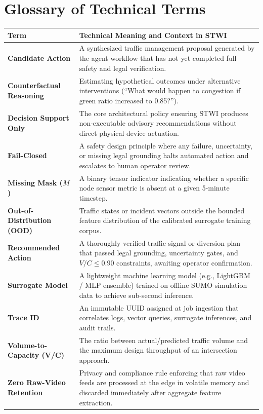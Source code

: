 \chapter*{Glossary of Technical Terms}

\begin{longtable}{|p{4.2cm}|p{10.8cm}|}
\hline
\rowcolor{blue!10}
\textbf{Term} & \textbf{Technical Meaning and Context in STWI} \\
\hline
\endhead

\textbf{Candidate Action} & A synthesized traffic management proposal generated by the agent workflow that has not yet completed full safety and legal verification. \\
\hline
\textbf{Counterfactual Reasoning} & Estimating hypothetical outcomes under alternative interventions (``What would happen to congestion if green ratio increased to 0.85?''). \\
\hline
\textbf{Decision Support Only} & The core architectural policy ensuring STWI produces non-executable advisory recommendations without direct physical device actuation. \\
\hline
\textbf{Fail-Closed} & A safety design principle where any failure, uncertainty, or missing legal grounding halts automated action and escalates to human operator review. \\
\hline
\textbf{Missing Mask ($M$)} & A binary tensor indicator indicating whether a specific node sensor metric is absent at a given 5-minute timestep. \\
\hline
\textbf{Out-of-Distribution (OOD)} & Traffic states or incident vectors outside the bounded feature distribution of the calibrated surrogate training corpus. \\
\hline
\textbf{Recommended Action} & A thoroughly verified traffic signal or diversion plan that passed legal grounding, uncertainty gates, and $V/C \le 0.90$ constraints, awaiting operator confirmation. \\
\hline
\textbf{Surrogate Model} & A lightweight machine learning model (e.g., LightGBM / MLP ensemble) trained on offline SUMO simulation data to achieve sub-second inference. \\
\hline
\textbf{Trace ID} & An immutable UUID assigned at job ingestion that correlates logs, vector queries, surrogate inferences, and audit trails. \\
\hline
\textbf{Volume-to-Capacity (V/C)} & The ratio between actual/predicted traffic volume and the maximum design throughput of an intersection approach. \\
\hline
\textbf{Zero Raw-Video Retention} & Privacy and compliance rule enforcing that raw video feeds are processed at the edge in volatile memory and discarded immediately after aggregate feature extraction. \\
\hline
\end{longtable}
